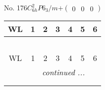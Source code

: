 \documentclass[fleqn,9pt,landscape]{jsarticle}
\begin{document}
\newpage
No. 176\quad$C_{6h}^{2}$\quad$P6_3/m$\quad[ hexagonal ]\quad$+\begin{pmatrix} 0 & 0 & 0 \end{pmatrix}$
\begin{center}
\renewcommand{\arraystretch}{1.2}
\begin{longtable}{ccccccc}
 \hline \hline
WL & 1 & 2 & 3 & 4 & 5 & 6 \\ \hline \endfirsthead

\multicolumn{6}{l}{\tablename\ \thetable{}} \\
 \hline \hline
WL & 1 & 2 & 3 & 4 & 5 & 6 \\ \hline \endhead

 \hline \hline
\multicolumn{6}{r}{\footnotesize\it continued ...} \\ \endfoot

 \hline \hline
\multicolumn{6}{r}{} \\ \endlastfoot


\end{longtable}
\end{center}
\end{document}
